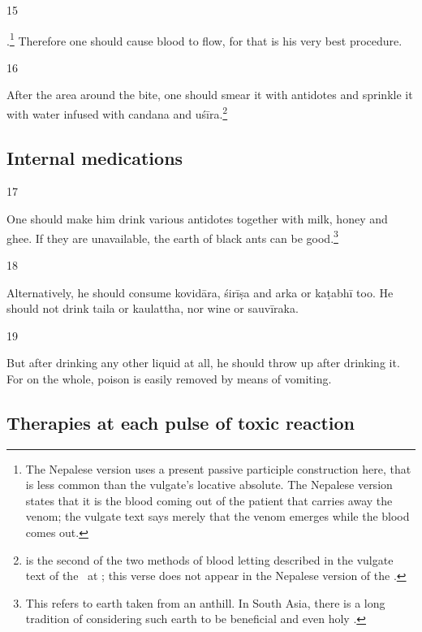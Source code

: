\begin{translation}
\item [15] 

.\footnote{The
    Nepalese version uses a present passive participle construction here,
    that is less common than the vulgate's locative absolute.  The Nepalese 
    version states that it is the blood coming out of the patient that carries away 
    the venom; the vulgate text says merely that the venom emerges while the 
    blood comes out.} Therefore one
    should cause blood to flow, for that is his very best procedure.

\item [16]  

After  the area around the bite, one should smear
it with antidotes and sprinkle it with water infused with
\gls{candana} and \gls{uśīra}.\footnote{ is the second of
    the two methods of blood letting  described in the vulgate text of the \SS\ at 
    ; this verse does not appear in the Nepalese version of the 
    \SS.\label{pracchana}}

\subsection{Internal medications}

\item [17]

One should make him drink various antidotes together
with milk, honey and ghee. If they are unavailable, the earth of black
ants can be good.\footnote{This refers to earth taken from an anthill. 
    In South Asia, there is a long tradition of considering such earth to be
    beneficial and even holy \citep[e.g.,][]{irwi-1982}.}


\item [18]

Alternatively, he should consume \gls{kovidāra}, \gls{śirīṣa}
and \gls{arka} or \gls{kaṭabhī} too.  He should not drink \gls{taila} or
\gls{kaulattha}, nor wine or  \gls{sauvīraka}.


\item [19]

But after drinking any other liquid at all, he should throw up after drinking it.  For 
on the whole, poison is easily removed by means of vomiting. 

\subsection{Therapies at each pulse of toxic reaction}


\end{translation}
